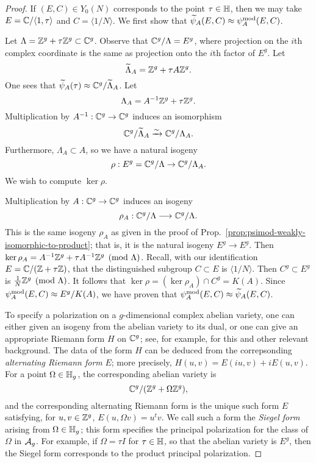 \documentclass{amsart}
\begin{document}
\begin{proof}
  If $(E, C) \in Y_0(N)$ corresponds to the point $\tau \in \mathbb{H}$, then we may take $E = \mathbb{C}/\langle 1, \tau \rangle$ and $C = \langle 1/N \rangle$. We first show that $\widetilde{\psi}_{A}(E,C) \approx \psi_{A}^\mathrm{mod}(E,C)$.

  Let $\Lambda = \mathbb{Z}^g + \tau \mathbb{Z}^g \subset \mathbb{C}^g$. Observe that $\mathbb{C}^g/\Lambda = E^g$, where projection on the $i$th complex coordinate is the same as projection onto the $i$th factor of $E^g$. Let
  \[
    \widetilde{\Lambda}_A = \mathbb{Z}^g + \tau A \mathbb{Z}^g.
  \]
  One sees that $\widetilde{\psi}_{A}(\tau) \approx \mathbb{C}^g/\widetilde{\Lambda}_A$. Let
  \[
    \Lambda_A = A^{-1}\mathbb{Z}^g + \tau \mathbb{Z}^g.
  \]
  Multiplication by $A^{-1}: \mathbb{C}^g \to \mathbb{C}^g$ induces an isomorphism
  \[
    \mathbb{C}^g/\widetilde{\Lambda}_A \xrightarrow{\sim} \mathbb{C}^g/\Lambda_A.
  \]
  Furthermore, $\Lambda_A \subset A$, so we have a natural isogeny
  \[
    \rho: E^g = \mathbb{C}^g/\Lambda \to \mathbb{C}^g/\Lambda_A.
  \]
  We wish to compute $\ker \rho$.

  Multiplication by $A: \mathbb{C}^g \to \mathbb{C}^g$ induces an isogeny
  \[
    \rho_A: \mathbb{C}^g/\Lambda \longrightarrow \mathbb{C}^g/\Lambda.
  \]
  This is the same isogeny $\rho_A$ as given in the proof of Prop.~\ref{prop:psimod-weakly-isomorphic-to-product}; that is, it is the natural isogeny $E^g \to E^g$. Then $\ker \rho_A = A^{-1}\mathbb{Z}^g + \tau A^{-1} \mathbb{Z}^g \pmod{\Lambda}$. Recall, with our identification $E = \mathbb{C}/(\mathbb{Z} + \tau\mathbb{Z})$, that the distinguished subgroup $C \subset E$ is $\langle 1/N \rangle$. Then $C^g \subset E^g$ is $\frac{1}{N}\mathbb{Z}^g \pmod{\Lambda}$. It follows that $\ker \rho = (\ker \rho_A) \cap C^g = K(A)$. Since $\psi_{A}^\mathrm{mod}(E,C) \approx E^g/K(A)$, we have proven that $\psi_{A}^\mathrm{mod}(E,C) \approx \widetilde{\psi}_{A}(E,C)$.

  To specify a polarization on a $g$-dimensional complex abelian variety, one can either given an isogeny from the abelian variety to its dual, or one can give an appropriate Riemann form $H$ on $\mathbb{C}^g$; see, for example, \cite{rosen-avc} for this and other relevant background. The data of the form $H$ can be deduced from the correpsonding \emph{alternating Riemann form} $E$; more precisely, $H(u,v) = E(iu,v) + i E(u,v)$. For a point $\Omega \in \mathbb{H}_g$, the corresponding abelian variety is
\[
\mathbb{C}^g/(\mathbb{Z}^g + \Omega \mathbb{Z}^g),
\]
and the corresponding alternating Riemann form is the unique such form $E$ satisfying, for $u,v \in \mathbb{Z}^g$, $E(u,\Omega v) = u^tv$. We call such a form the \emph{Siegel form} arising from $\Omega \in \mathbb{H}_g$; this form specifies the principal polarization for the class of $\Omega$ in $\mathcal{A}_g$. For example, if $\Omega = \tau I$ for $\tau \in \mathbb{H}$, so that the abelian variety is $E^g$, then the Siegel form corresponds to the product principal polarization.


\end{proof}
\end{document}
